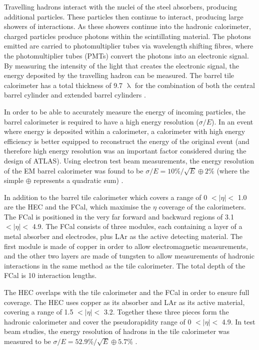 \documentclass[12pt,a4paper,epsf,portrait,times,epsfig]{article}
\begin{document}
		Travelling hadrons interact with the nuclei of the steel absorbers, producing additional particles. These particles then continue to interact, producing large showers of interactions. As these showers continue into the hadronic calorimeter, charged particles produce
		photons within the scintillating material. The photons emitted are carried to photomultiplier tubes via wavelength shifting fibres, where the photomultiplier tubes (PMTs) convert the photons into an electronic signal. By measuring the intensity of the light that creates the electronic signal, the energy deposited by the travelling hadron can be
		measured. The barrel tile calorimeter has a total thickness of 9.7 $\uplambda$ for the combination of both the central barrel cylinder and extended barrel cylinders 
		\cite{ATLAS-TDR-01, ATLAS-TDR-02, Article:ATLASDesignPaper}. \par 
		
		In order to be able to accurately measure the energy of incoming particles, the barrel calorimeter is required to have a high energy resolution ($\sigma/E$). In an event where energy is deposited within a calorimeter, a calorimeter with high energy efficiency is better equipped to reconstruct the energy of the original event (and therefore high energy resolution was an important factor considered during the design of ATLAS). Using electron test beam measurements, the energy resolution of the EM barrel calorimeter was found to be $\sigma/E = 10\%/\sqrt{E} \oplus 2\%$ (where the simple $\oplus$ represents a quadratic sum) \cite{Article:ECALCalibration}. 
		
		In addition to the barrel tile calorimeter which covers a range of 0 $< |\eta| <$ 1.0 are the HEC and the FCal, which maximise the $\eta$ coverage of the calorimeters. The FCal is positioned in the very far forward and backward regions of 3.1 $< |\eta| <$ 4.9. The FCal consists of three modules, each containing a layer of a metal absorber and electrodes, plus LAr as the active detecting material. The first module is made of copper in order to allow electromagnetic measurements, and the other two layers are made of tungsten to allow measurements of hadronic interactions in the same method as the tile calorimeter. The total depth of the FCal is 10 interaction lengths. \par
		
		The HEC overlaps with the tile calorimeter and the FCal in order to ensure full  coverage. The HEC uses copper as its absorber and LAr as its active material, covering a range of 1.5 $< |\eta| <$ 3.2. Together these three pieces form the hadronic calorimeter and cover the
		pseudorapidity range of 0 $< |\eta| <$ 4.9. In test beam studies, the energy resolution of hadrons in the tile calorimeter was measured to be $\sigma/E=52.9\%/\sqrt{E} \oplus 5.7\%$ \cite{Article:FCALCalibration}. 
		
\end{document}
